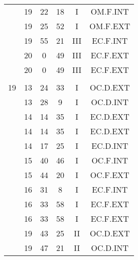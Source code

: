 \documentclass[12pt, a4paper]{article}
\begin{document}
\begin{multicols}{3}
{\begin{tabular}{c c c c c c}
	 	 	 	 & 19 & 22 & 18 & I & OM.F.INT\\%
	 	 	 	 & 19 & 25 & 52 & I & OM.F.EXT\\%
	 	 	 	 & 19 & 55 & 21 & III & EC.F.INT\\%
	 	 	 	 & 20 & 0 & 49 & III & EC.F.EXT\\%
	 	 	 	 & 20 & 0 & 49 & III & EC.F.EXT\\%
	 	 	 	 & & & & & \\%
	 	 	 	19 & 13 & 24 & 33 & I & OC.D.EXT\\%
	 	 	 	 & 13 & 28 & 9 & I & OC.D.INT\\%
	 	 	 	 & 14 & 14 & 35 & I & EC.D.EXT\\%
	 	 	 	 & 14 & 14 & 35 & I & EC.D.EXT\\%
	 	 	 	 & 14 & 17 & 25 & I & EC.D.INT\\%
	 	 	 	 & 15 & 40 & 46 & I & OC.F.INT\\%
	 	 	 	 & 15 & 44 & 20 & I & OC.F.EXT\\%
	 	 	 	 & 16 & 31 & 8 & I & EC.F.INT\\%
	 	 	 	 & 16 & 33 & 58 & I & EC.F.EXT\\%
	 	 	 	 & 16 & 33 & 58 & I & EC.F.EXT\\%
	 	 	 	 & 19 & 43 & 25 & II & OC.D.EXT\\%
	 	 	 	 & 19 & 47 & 21 & II & OC.D.INT\\%
	 	 \end{tabular}
 	}
\end{multicols}
\end{document}
